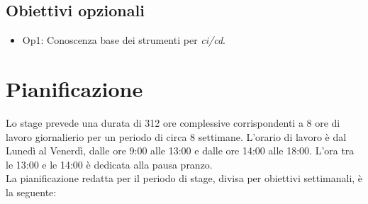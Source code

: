 \subsection{Obiettivi opzionali}
\begin{itemize}
    \item Op1: Conoscenza base dei strumenti per \textit{\gls{ci}\glsfirstoccur{}/\gls{cd}\glsfirstoccur{}}.
\end{itemize}

\section{Pianificazione}
Lo stage prevede una durata di 312 ore complessive corrispondenti a 8 ore di lavoro giornalierio per un periodo di circa 8 settimane. L'orario di lavoro è dal Lunedì al Venerdì, dalle ore 9:00 alle 13:00 e dalle ore 14:00 alle 18:00. L'ora tra le 13:00 e le 14:00 è dedicata alla pausa pranzo.
\\La pianificazione redatta per il periodo di stage, divisa per obiettivi settimanali, è la seguente:
